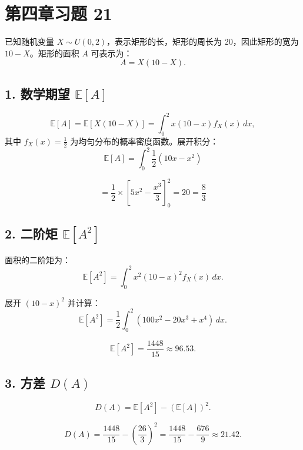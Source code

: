 \documentclass[twoside]{article}
\begin{document}
\maketitle
\vspace{-3.5em}

\tableofcontents

\section{第四章习题 21}

\begin{ans}{21}{21}
    已知随机变量 \( X \sim U(0,2) \)，表示矩形的长，矩形的周长为 20，因此矩形的宽为 \( 10 - X \)。矩形的面积 \( A \) 可表示为：
    \[
    A = X(10 - X).
    \]
    
    \subsection*{1. 数学期望 \( \mathbb{E}[A] \)}
    
    \[
    \mathbb{E}[A] = \mathbb{E}[X(10 - X)] = \int_{0}^{2} x(10 - x) f_X(x) \, dx,
    \]
    其中 \( f_X(x) = \frac{1}{2} \) 为均匀分布的概率密度函数。展开积分：
    \[
    \mathbb{E}[A] = \int_{0}^{2} \frac{1}{2} (10x - x^2) 
    \]
    
    \[
     = \frac{1}{2} \times \left[ 5x^2 - \frac{x^3}{3} \right]_{0}^{2} = 20 = \frac{8}{3}
    \]
    
    \subsection*{2. 二阶矩 \( \mathbb{E}[A^2] \)}
    
    面积的二阶矩为：
    \[
    \mathbb{E}[A^2] = \int_{0}^{2} x^2 (10 - x)^2 f_X(x) \, dx.
    \]
    
    展开 \( (10 - x)^2 \) 并计算：
    \[
    \mathbb{E}[A^2] = \frac{1}{2} \int_{0}^{2} (100x^2 - 20x^3 + x^4) \, dx.
    \]
    
    \[
    \mathbb{E}[A^2] = \frac{1448}{15} \approx 96.53.
    \]
    
    \subsection*{3. 方差 \( D(A) \)}
    \[
    D(A) = \mathbb{E}[A^2] - (\mathbb{E}[A])^2.
    \]
    
    \[
    D(A) = \frac{1448}{15} - \left(\frac{26}{3}\right)^2 = \frac{1448}{15} - \frac{676}{9} \approx 21.42.
    \]
\end{ans}
\end{document}
